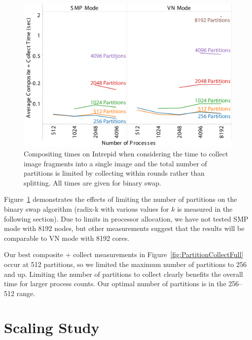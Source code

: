 \documentclass{sig-alternate}
\begin{document}
\begin{figure}[bp]%
  \centering
  \includegraphics[width=\linewidth]{images/PartitionCollectIntrepidReduced}
  \caption{Compositing times on Intrepid when considering the time to
    collect image fragments into a single image and the total number of
    partitions is limited by collecting within rounds rather than
    splitting.  All times are given for binary swap.}
  \label{fig:PartitionCollectReduced}
\end{figure}

Figure~\ref{fig:PartitionCollectReduced} demonstrates the effects of
limiting the number of partitions on the binary swap algorithm (radix-k
with various values for $k$ is measured in the following section).  Due to
limits in processor allocation, we have not tested SMP mode with 8192
nodes, but other measurements suggest that the results will be comparable
to VN mode with 8192 cores.

Our best composite + collect measurements in
Figure~\ref{fig:PartitionCollectFull} occur at 512 partitions, so we
limited the maximum number of partitions to 256 and up.  Limiting the
number of partitions to collect clearly benefits the overall time for
larger process counts.  Our optimal number of partitions is in the 256--512
range.

\section{Scaling Study}
\label{sec:Scaling}
\end{document}

